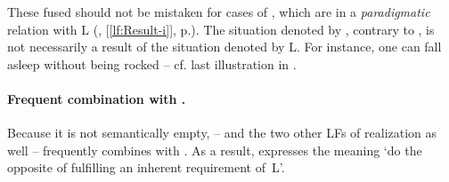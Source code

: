 These fused  should not be mistaken for cases of , which are in a \emph{paradigmatic} relation with L (, [\ref{lf:Result-i}], p.\thinspace\pageref{lf:Result-i}). The situation denoted by , contrary to , is not necessarily a result of the situation denoted by L. For instance, one can fall asleep without being rocked -- cf. last illustration in \Last.

\paragraph*{Frequent combination with .}

Because it is not semantically empty,  -- and the two other LFs of realization as well -- frequently combines with . As a result, \label{lf:AntiReal-i} expresses the meaning `do the opposite of fulfilling an inherent requirement of~L'.

\begingroup
\small

